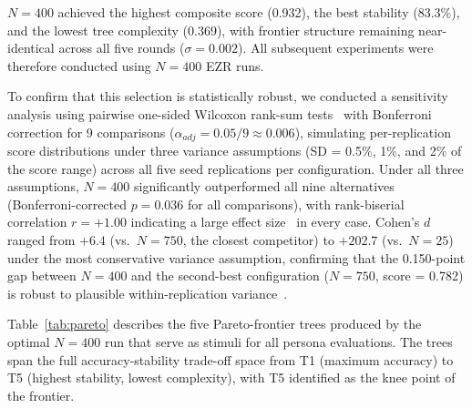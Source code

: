 \documentclass[sigconf,review]{acmart}
\begin{document}
\noindent $N = 400$ achieved the highest composite score (0.932), the best stability
(83.3\%), and the lowest tree complexity (0.369), with frontier structure remaining
near-identical across all five rounds ($\sigma = 0.002$). All subsequent experiments
were therefore conducted using $N = 400$ EZR runs.

\noindent To confirm that this selection is statistically robust, we conducted a
sensitivity analysis using pairwise one-sided Wilcoxon rank-sum tests~\cite{mann1947test}
with Bonferroni correction for 9 comparisons ($\alpha_{adj} = 0.05/9 \approx 0.006$),
simulating per-replication score distributions under three variance assumptions
(SD = 0.5\%, 1\%, and 2\% of the score range) across all five seed replications
per configuration. Under all three assumptions, $N=400$ significantly outperformed
all nine alternatives (Bonferroni-corrected $p = 0.036$ for all comparisons),
with rank-biserial correlation $r = +1.00$ indicating a large effect
size~\cite{kerby2014simple} in every case. Cohen's $d$ ranged from $+6.4$
(vs.\ $N=750$, the closest competitor) to $+202.7$ (vs.\ $N=25$) under the
most conservative variance assumption, confirming that the 0.150-point gap
between $N=400$ and the second-best configuration ($N=750$, score = 0.782)
is robust to plausible within-replication variance~\cite{cohen1988statistical}.



\noindent Table~\ref{tab:pareto} describes the five Pareto-frontier trees produced
by the optimal $N=400$ run that serve as stimuli for all persona evaluations.
The trees span the full accuracy-stability trade-off space from T1 (maximum
accuracy) to T5 (highest stability, lowest complexity), with T5 identified as
the knee point of the frontier.
\end{document}
